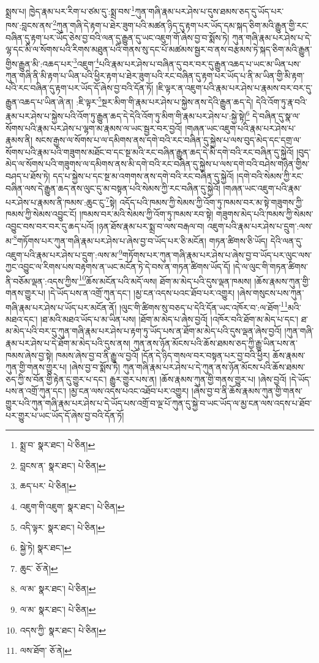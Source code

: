 སྨྲས་པ། ཁྱེད་རྣམ་པར་རིག་པ་ཙམ་དུ་:སྨྲ་བས་\footnote{སྨྲ་བ་  སྣར་ཐང་།  པེ་ཅིན། }ཀུན་གཞི་རྣམ་པར་ཤེས་པ་དུས་ཐམས་ཅད་དུ་ཡོད་པར་ཁས་:བླངས་ནས་\footnote{བླངས་ན་  སྣར་ཐང་།  པེ་ཅིན། }ཀུན་གཞི་དེ་རྟག་པ་ཐེར་ཟུག་པའི་མཚན་ཉིད་དུ་རྟག་པར་ཡོད་དམ་སྐད་ཅིག་མའི་རྒྱུན་གྱི་རང་བཞིན་དུ་རྟག་པར་ཡོད་ཅེས་བྱ་བའི་ལན་དུ་རྒྱུན་དུ་ཡང་འཇུག་གོ་ཞེས་བྱ་བ་སྨོས་ཏེ། ཀུན་གཞི་རྣམ་པར་ཤེས་པ་དེ་ལྷ་དང་མི་ལ་སོགས་པའི་རིགས་མཐུན་པའི་གནས་སུ་དང་པོ་མཚམས་སྦྱར་བ་ནས་བརྩམས་ཏེ་སྐད་ཅིག་མའི་རྒྱུན་གྱིས་རྒྱུན་མི་:འཆད་པར་\footnote{ཆད་པར་  པེ་ཅིན། }འཇུག་\footnote{འཇུག་གི་འཇུག་  སྣར་ཐང་།  པེ་ཅིན། }པའི་རྣམ་པར་ཤེས་པ་བཞིན་དུ་བར་བར་དུ་རྒྱུན་འཆད་པ་ཡང་མ་ཡིན་པས་ཀུན་གཞི་ནི་མི་རྟག་པ་ཡིན་པའི་ཕྱིར་རྟག་པ་ཐེར་ཟུག་པའི་རང་བཞིན་དུ་རྟག་པར་ཡོད་པ་ནི་མ་ཡིན་གྱི་མི་རྟག་པའི་རང་བཞིན་དུ་རྟག་པར་ཡོད་དོ་ཞེས་བྱ་བའི་དོན་ཏོ། །ཇི་ལྟར་ན་འཇུག་པའི་རྣམ་པར་ཤེས་པ་རྣམས་བར་བར་དུ་རྒྱུན་འཆད་པ་ཡིན་ཞེ་ན། :ཇི་ལྟར་\footnote{འདི་ལྟར་  སྣར་ཐང་།  པེ་ཅིན། }སྔར་མིག་གི་རྣམ་པར་ཤེས་པ་སྐྱེས་ནས་དེའི་རྒྱུན་ཆད་དེ། དེའི་འོག་ཏུ་རྣ་བའི་རྣམ་པར་ཤེས་པ་སྐྱེས་པའི་འོག་ཏུ་རྒྱུན་ཆད་དེ་དེའི་འོག་ཏུ་མིག་གི་རྣམ་པར་ཤེས་པ་:སྐྱེ་སྟེ།\footnote{སྐྱེ་ཏེ།  སྣར་ཐང་། } དེ་བཞིན་དུ་སྣ་ལ་སོགས་པའི་རྣམ་པར་ཤེས་པ་ལྷག་མ་རྣམས་ལ་ཡང་སྦྱར་བར་བྱའོ། །གཞན་ཡང་འཇུག་པའི་རྣམ་པར་ཤེས་པ་རྣམས་ནི། སངས་རྒྱས་ལ་སོགས་པ་ལ་དམིགས་ནས་དགེ་བའི་རང་བཞིན་དུ་སྐྱེས་པ་ལས་བུད་མེད་དང་དགྲ་ལ་སོགས་པའི་རྣམ་པའི་གཟུགས་མཐོང་བ་དང་སྔ་མའི་རང་བཞིན་རྒྱུན་ཆད་དེ་མི་དགེ་བའི་རང་བཞིན་དུ་སྐྱེའོ། །བུད་མེད་ལ་སོགས་པའི་གཟུགས་ལ་དམིགས་ནས་མི་དགེ་བའི་རང་བཞིན་དུ་སྐྱེས་པ་ལས་དགེ་བའི་བཤེས་གཉེན་གྱིས་བཤད་པ་ཐོས་ཏེ། དད་པ་སྐྱེས་པ་དང་སྔ་མ་འགགས་ནས་དགེ་བའི་རང་བཞིན་དུ་སྐྱེའོ། །དགེ་བའི་སེམས་ཀྱི་རང་བཞིན་ལས་དེ་རྒྱུན་ཆད་ནས་ལུང་དུ་མ་བསྟན་པའི་སེམས་ཀྱི་རང་བཞིན་དུ་སྐྱེའོ། །གཞན་ཡང་འཇུག་པའི་རྣམ་པར་ཤེས་པ་རྣམས་ནི་ཁམས་:ཆུང་ངུ་\footnote{ཆུང་  ཅོ་ནེ། }སྟེ། འདོད་པའི་ཁམས་ཀྱི་སེམས་ཀྱི་འོག་ཏུ་ཁམས་བར་མ་སྟེ་གཟུགས་ཀྱི་ཁམས་ཀྱི་སེམས་འབྱུང་ངོ། །ཁམས་བར་མའི་སེམས་ཀྱི་འོག་ཏུ་ཁམས་རབ་སྟེ། གཟུགས་མེད་པའི་ཁམས་ཀྱི་སེམས་འབྱུང་བས་བར་བར་དུ་ཆད་པའོ། །ཉན་ཐོས་རྣམ་པར་སྨྲ་བ་ལས་བརྒལ་བ། འཇུག་པའི་རྣམ་པར་ཤེས་པ་དྲུག་:ལས་མ་\footnote{ལ་མ་  སྣར་ཐང་།  པེ་ཅིན། }གཏོགས་པར་ཀུན་གཞི་རྣམ་པར་ཤེས་པ་ཞེས་བྱ་བ་ཡོད་པར་ཅི་མངོན། གཏན་ཚིགས་ཅི་ཡོད། དེའི་ལན་དུ་འཇུག་པའི་རྣམ་པར་ཤེས་པ་དྲུག་:ལས་མ་\footnote{ལ་མ་  སྣར་ཐང་།  པེ་ཅིན། }གཏོགས་པར་ཀུན་གཞི་རྣམ་པར་ཤེས་པ་ཞེས་བྱ་བ་ཡོད་པར་ལུང་ལས་ཀྱང་འབྱུང་ལ་རིགས་པས་བརྟགས་ན་ཡང་མངོན་ཏེ་དེ་བས་ན་གཏན་ཚིགས་ཡོད་དོ། །དེ་ལ་ལུང་གི་གཏན་ཚིགས་ནི་བཅོམ་ལྡན་:འདས་ཀྱིས་\footnote{འདས་ཀྱི་  སྣར་ཐང་།  པེ་ཅིན། }ཆོས་མངོན་པའི་མདོ་ལས། ཐོག་མ་མེད་པའི་དུས་ལྡན་ཁམས། །ཆོས་རྣམས་ཀུན་གྱི་གནས་གྱུར་པ། །དེ་ཡོད་པས་ན་འགྲོ་ཀུན་དང་། །མྱ་ངན་འདས་པའང་ཐོབ་པར་འགྱུར། །ཞེས་གསུངས་པས་ཀུན་གཞི་རྣམ་པར་ཤེས་པ་ཡོད་པར་མངོན་ནོ། །ལུང་གི་ཚིགས་སུ་བཅད་པ་དེའི་དོན་ཡང་འཁོར་བ་:ལ་ཐོག་\footnote{ལས་ཐོག་  ཅོ་ནེ། }མའི་མཐའ་དང་། །ཐ་མའི་མཐའ་ཡོད་པ་མ་ཡིན་པས། །ཐོག་མ་མེད་པ་ཞེས་བྱའོ། །འཁོར་བའི་ཐོག་མ་མེད་པ་དང་། ཐ་མ་མེད་པའི་བར་དུ་ཀུན་གཞི་རྣམ་པར་ཤེས་པ་རྟག་ཏུ་ཡོད་པས་ན་ཐོག་མ་མེད་པའི་དུས་ལྡན་ཞེས་བྱའོ། །ཀུན་གཞི་རྣམ་པར་ཤེས་པ་དེ་ཐོག་མ་མེད་པའི་དུས་ནས། ཀུན་ནས་ཉོན་མོངས་པའི་ཆོས་ཐམས་ཅད་ཀྱི་རྒྱུ་ཡིན་པས་ན་ཁམས་ཞེས་བྱ་སྟེ། ཁམས་ཞེས་བྱ་བ་ནི་རྒྱུ་ལ་བྱའོ། །དོན་དེ་ཉིད་གསལ་བར་བསྟན་པར་བྱ་བའི་ཕྱིར། ཆོས་རྣམས་ཀུན་གྱི་གནས་གྱུར་པ། །ཞེས་བྱ་བ་སྨོས་ཏེ། ཀུན་གཞི་རྣམ་པར་ཤེས་པ་དེ་ཀུན་ནས་ཉོན་མོངས་པའི་ཆོས་ཐམས་ཅད་ཀྱི་ས་བོན་གྱི་རྟེན་དུ་གྱུར་པ་དང་། རྒྱུར་གྱུར་པས་ན། །ཆོས་རྣམས་ཀུན་གྱི་གནས་གྱུར་པ། །ཞེས་བྱའོ། །དེ་ཡོད་པས་ན་འགྲོ་ཀུན་དང་། །མྱ་ངན་ལས་འདས་པའང་འཐོབ་པར་འགྱུར། །ཞེས་བྱ་བ་ནི་ཆོས་རྣམས་ཀུན་གྱི་གནས་གྱུར་པའི་ཀུན་གཞི་རྣམ་པར་ཤེས་པ་དེ་ཡོད་པས་འགྲོ་བ་ལྔ་པོ་ཀུན་དུ་སྐྱེ་བ་ཡང་ཡོད་ལ་མྱ་ངན་ལས་འདས་པ་ཐོབ་པར་གྱུར་པ་ཡང་ཡོད་དོ་ཞེས་བྱ་བའི་དོན་ཏོ། 